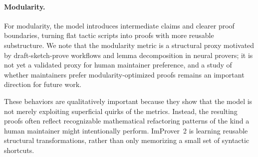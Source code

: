 \paragraph{Modularity.} For modularity, the model introduces intermediate claims and clearer proof boundaries, turning flat tactic scripts into proofs with more reusable substructure. We note that the modularity metric is a structural proxy motivated by draft-sketch-prove workflows and lemma decomposition in neural provers; it is not yet a validated proxy for human maintainer preference, and a study of whether maintainers prefer modularity-optimized proofs remains an important direction for future work.

These behaviors are qualitatively important because they show that the model is not merely exploiting superficial quirks of the metrics. Instead, the resulting proofs often reflect recognizable mathematical refactoring patterns of the kind a human maintainer might intentionally perform. ImProver~2 is learning reusable structural transformations, rather than only memorizing a small set of syntactic shortcuts.
